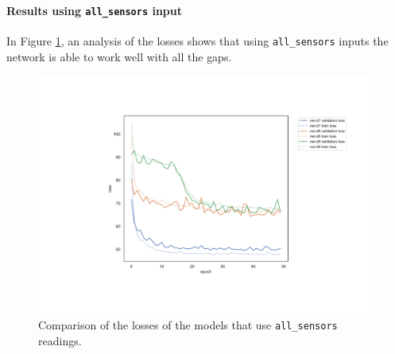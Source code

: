 \paragraph*{Results using \texttt{all\_sensors} input}
In Figure \ref{fig:distlossall}, an analysis of the losses shows that using 
\texttt{all\_sensors} inputs the network is able to work well with all the 
gaps. 
\begin{figure}[!htb]
	\centering
	\includegraphics[width=.8\textwidth]{contents/images/task1/loss-distributed-all_sensors@}%
	\caption{Comparison of the losses of the models that use \texttt{all\_sensors} 
		readings.}
	\label{fig:distlossall}
\end{figure}

